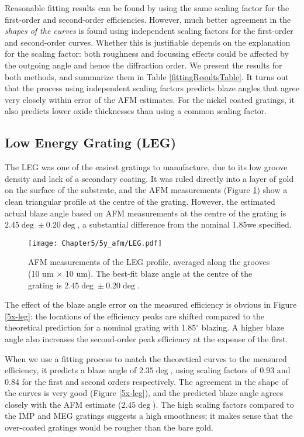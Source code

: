 Reasonable fitting results can be found by using the same scaling factor for the first-order and second-order efficiencies.  However, much better agreement in the \emph{shapes of the curves} is found using independent scaling factors for the first-order and second-order curves.   Whether this is justifiable depends on the explanation for the scaling factor: both roughness and focussing effects could be affected by the outgoing angle and hence the diffraction order.  We present the results for both methods, and summarize them in Table \ref{fittingResultsTable}.  It turns out that the process using independent scaling factors predicts blaze angles that agree very closely within error of the AFM estimates.  For the nickel coated gratings, it also predicts lower oxide thicknesses than using a common scaling factor.

\subsection{Low Energy Grating (LEG)}
The LEG was one of the easiest gratings to manufacture, due to its low groove density and lack of a secondary coating.  It was ruled directly into a layer of gold on the surface of the substrate, and the AFM measurements (Figure \ref{5y-leg}) show a clean triangular profile at the centre of the grating.  However, the estimated actual blaze angle based on AFM measurements at the centre of the grating is $2.45\deg \pm 0.20\deg$, a substantial difference from the nominal 1.85\dg we specified.

\begin{figure}[htbp] %
   \centering
   \texttt{[image: Chapter5/5y\_afm/LEG.pdf]} 
   \caption{AFM measurements of the LEG profile, averaged along the grooves (10 um $\times$ 10 um).  The best-fit blaze angle at the centre of the grating is $2.45\deg \pm 0.20\deg$.}
   \label{5y-leg}
\end{figure}
The effect of the blaze angle error on the measured efficiency is obvious in Figure \ref{5x-leg}: the locations of the efficiency peaks are shifted compared to the theoretical prediction for a nominal grating with 1.85$^\circ$ blazing.  A higher blaze angle also increases the second-order peak efficiency at the expense of the first.

When we use a fitting process to match the theoretical curves to the measured efficiency, it predicts a blaze angle of $2.35\deg$, using scaling factors of 0.93 and 0.84 for the first and second orders respectively.   The agreement in the shape of the curves is very good (Figure \ref{5x-leg}), and the predicted blaze angle agrees closely with the AFM estimate ($2.45\deg$).  The high scaling factors compared to the IMP and MEG gratings suggests a high smoothness; it makes sense that the over-coated gratings would be rougher than the bare gold.

